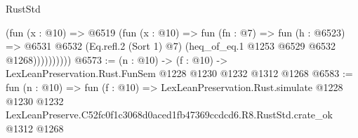 \begin{lexlean}{RustStd}
\begin{coremodule}
                  (fun (x : @10) =>
                  @6519
                    (fun (x : @10) =>
                    fun (fn : @7) =>
                    fun (h : @6523) =>
                    @6531
                      @6532
                      (Eq.refl.{2} (Sort 1) @7)
                      (heq_of_eq.{1} @1253 @6529 @6532 @1268))))))))))
@6573 := (n : @10) -> (f : @10) -> LexLeanPreservation.Rust.FunSem @1228 @1230 @1232 @1312 @1268
@6583 := fun (n : @10) =>
  fun (f : @10) =>
  LexLeanPreservation.Rust.simulate
    @1228
    @1230
    @1232
    LexLeanPreserve.C52fc0f1c3068d0aced1fb47369ccdcd6.R8.RustStd.crate_ok
    @1312
    @1268
\end{coremodule}
\end{lexlean}

